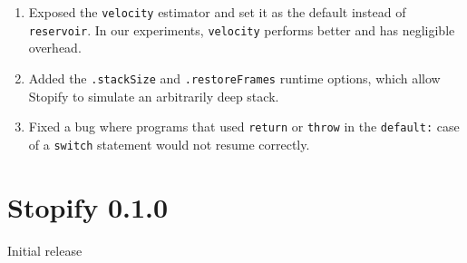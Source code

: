 \documentclass[10pt]{book}
\begin{document}
\begin{enumerate}

  \item Exposed the \texttt{velocity} estimator and set it as the default
  instead of \texttt{reservoir}. In our experiments, \texttt{velocity} performs
  better and has negligible overhead.

  \item Added the \lstinline|.stackSize| and \lstinline|.restoreFrames|
  runtime options, which allow Stopify to simulate an arbitrarily deep stack.

  \item Fixed a bug where programs that used \lstinline|return| or
  \lstinline|throw| in the \lstinline|default:| case of a \lstinline|switch|
  statement would not resume correctly.

\end{enumerate}

\section{Stopify 0.1.0}

Initial release
\end{document}
